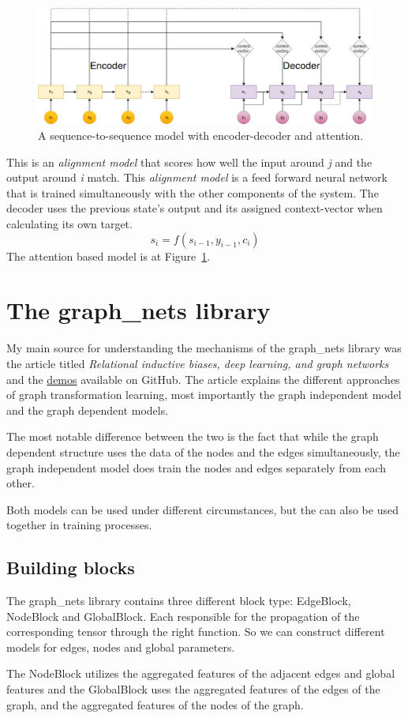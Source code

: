 \begin{figure}[!ht]
	\centering
	\includegraphics[width=150mm, keepaspectratio]{figures/attention.jpg}
	\caption{A sequence-to-sequence model with encoder-decoder and attention.}
	\label{fig:attention}
\end{figure}

This is an \textit{alignment model} that scores how well the input around \textit{j} and the output around \textit{i} match. This \textit{alignment model} is a feed forward neural network that is trained simultaneously with the other components of the system.
The decoder uses the previous state's output and its assigned context-vector when calculating its own target.
\[s_i = f(s_{i-1}, y_{i-1}, c_i)\]
The attention based model is at Figure~\ref{fig:attention}.


\section{The graph\_nets library}
My main source for understanding the mechanisms of the graph\_nets library was the article titled \textit{Relational inductive biases, deep learning, and graph networks}\cite{GraphNet} and the \href{https://github.com/deepmind/graph_nets/tree/master/graph_nets/demos}{demos} available on GitHub.
The article explains the different approaches of graph transformation learning, most importantly the graph independent model and the graph dependent models.

The most notable difference between the two is the fact that while the graph dependent structure uses the data of the nodes and the edges simultaneously, the graph independent model does train the nodes and edges separately from each other.

Both models can be used under different circumstances, but the can also be used together in training processes.

\subsection{Building blocks}
The graph\_nets library contains three different block type: EdgeBlock, NodeBlock and GlobalBlock. Each responsible for the propagation of the corresponding tensor through the right function. So we can construct different models for edges, nodes and global parameters.

The NodeBlock utilizes the aggregated features of the adjacent edges and global features and the GlobalBlock uses the aggregated features of the
edges of the graph, and the aggregated features of the nodes of the graph.